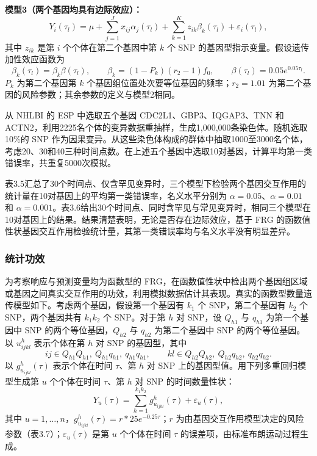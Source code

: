 \textbf{模型3（两个基因均具有边际效应）：}
\[
Y_i(\tau_l)=\mu+\sum_{j=1}^{J}x_{ij}\alpha_j(\tau_l)
+\sum_{k=1}^{K}z_{ik}\beta_k(\tau_l)+\varepsilon_i(\tau_l),
\]
其中 $z_{ik}$ 是第 $i$ 个个体在第二个基因中第 $k$ 个 SNP 的基因型指示变量。假设遗传加性效应函数为
\[
\beta_k(\tau_l)=\beta_k\beta(\tau_l),\qquad
\beta_k=(1-P_k)(r_2-1)f_0,\qquad
\beta(\tau_l)=0.05e^{0.05\tau_l}.
\]
$P_k$ 为第二个基因第 $k$ 个基因组位置处次要等位基因的频率；$r_2=1.01$ 为第二个基因的风险参数；其余参数的定义与模型2相同。

从 NHLBI 的 ESP 中选取五个基因 CDC2L1、GBP3、IQGAP3、TNN 和 ACTN2，利用2225名个体的变异数据重抽样，生成1,000,000条染色体。随机选取10\%的 SNP 作为因果变异。从这些染色体构成的群体中抽取1000至3000名个体，考虑20、30和40三种时间点数。在上述五个基因中选取10对基因，计算平均第一类错误率，共重复5000次模拟。

表3.5汇总了30个时间点、仅含罕见变异时，三个模型下检验两个基因交互作用的统计量在10对基因上的平均第一类错误率，名义水平分别为 $\alpha=0.05$、$\alpha=0.01$ 和 $\alpha=0.001$。表3.6给出30个时间点、同时含罕见与常见变异时，相同三个模型在10对基因上的结果。结果清楚表明，无论是否存在边际效应，基于 FRG 的函数值性状基因交互作用检验统计量，其第一类错误率均与名义水平没有明显差异。



\FloatBarrier

\subsubsection{统计功效}

为考察响应与预测变量均为函数型的 FRG，在函数值性状中检出两个基因组区域或基因之间真实交互作用的功效，利用模拟数据估计其表现。真实的函数型数量遗传模型如下。考虑两个基因，假设第一个基因有 $k_1$ 个 SNP，第二个基因有 $k_2$ 个 SNP，两个基因共有 $k_1k_2$ 个 SNP。对于第 $h$ 对 SNP，设 $Q_{h1}$ 与 $q_{h1}$ 为第一个基因中 SNP 的两个等位基因，$Q_{h2}$ 与 $q_{h2}$ 为第二个基因中 SNP 的两个等位基因。以 $u_{ijkl}^h$ 表示个体在第 $h$ 对 SNP 的基因型，其中
\[
ij\in Q_{h1}Q_{h1},\ Q_{h1}q_{h1},\ q_{h1}q_{h1},\qquad
kl\in Q_{h2}Q_{h2},\ Q_{h2}q_{h2},\ q_{h2}q_{h2}.
\]
以 $g_{u_{ijkl}}^h(\tau)$ 表示个体在时间 $\tau$、第 $h$ 对 SNP 上的基因型值。用下列多重回归模型生成第 $u$ 个个体在时间 $\tau$、第 $h$ 对 SNP 的时间数量性状：
\begin{equation}
Y_u(\tau)=\sum_{h=1}^{k_1k_2}g_{u_{ijkl}}^h(\tau)+\varepsilon_u(\tau),
\tag{3.99}
\end{equation}
其中 $u=1,\ldots,n$，$g_{u_{ijkl}}^h(\tau)=r*25e^{-0.25\tau}$；$r$ 为由基因交互作用模型决定的风险参数（表3.7）；$\varepsilon_u(\tau)$ 是第 $u$ 个个体在时间 $\tau$ 的误差项，由标准布朗运动过程生成。

